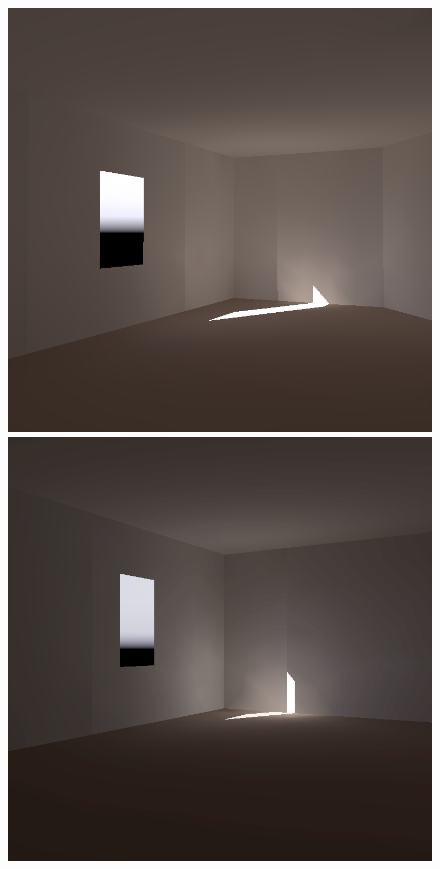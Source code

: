 \begin{figure}[t]
\begin{small}
\includegraphics[width=\figwidth]{p2r_user_085_camera_chris_march.png} \hfill   %
\includegraphics[width=\figwidth]{p2r_PRE_N6_march_chris.png}\vspace{-0.13in}\\ 


\end{small}
\end{figure}
